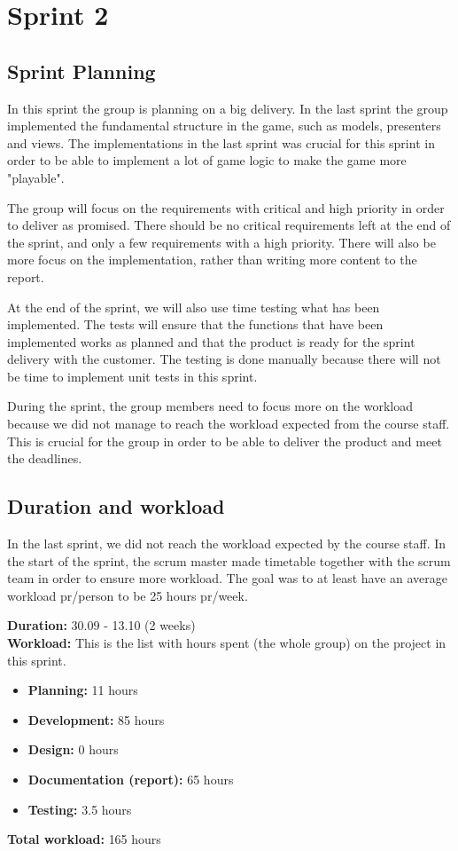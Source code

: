 \section{Sprint 2}

\subsection{Sprint Planning}
	In this sprint the group is planning on a big delivery. In the last sprint the group
	implemented the fundamental structure in the game, such as models, presenters and views. 
	The implementations in the last sprint was crucial for this sprint in order to 
	be able to implement a lot of game logic to make the game more "playable".

	The group will focus on the requirements with critical and high priority in order
	to deliver as promised. There should be no critical requirements left at the end of 
	the sprint, and only a few requirements with a high priority. There will also be more 
	focus on the implementation, rather than writing more content to the report.

	At the end of the sprint, we will also use time testing what has been implemented.
	The tests will ensure that the functions that have been implemented works as planned 
	and that the product is ready for the sprint delivery with the customer. The testing is 
	done manually because there will not be time to implement unit tests in this sprint.

	During the sprint, the group members need to focus more on the workload because we did
	not manage to reach the workload expected from the course staff. This is crucial
	for the group in order to be able to deliver the product and meet the deadlines.

\subsection{Duration and workload}
	In the last sprint, we did not reach the workload expected by the course staff.
	In the start of the sprint, the scrum master made timetable together with the
	scrum team in order to ensure more workload. The goal was to at least have an
	average workload pr/person to be 25 hours pr/week. 

	{\bf Duration:} 30.09 - 13.10 (2 weeks)\\
	{\bf Workload:} This is the list with hours spent (the whole group) on the project in this sprint.
	\begin{itemize}
		\item {\bf Planning:} 11 hours
		\item {\bf Development:} 85 hours
		\item {\bf Design:} 0 hours
		\item {\bf Documentation (report):} 65 hours
		\item {\bf Testing:} 3.5 hours
	\end{itemize}
	{\bf Total workload: } 165 hours \\

